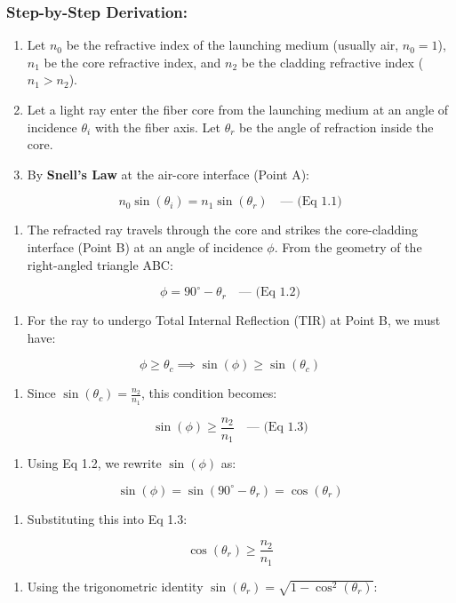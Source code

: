 \subsubsection{Step-by-Step Derivation:}
\begin{enumerate}
  \item Let $n_0$ be the refractive index of the launching medium (usually air, $n_0 = 1$), $n_1$ be the core refractive index, and $n_2$ be the cladding refractive index ($n_1 > n_2$).
  \item Let a light ray enter the fiber core from the launching medium at an angle of incidence $\theta_i$ with the fiber axis. Let $\theta_r$ be the angle of refraction inside the core.
  \item By \textbf{Snell's Law} at the air-core interface (Point A):
\end{enumerate}
    \[ n_0 \sin(\theta_i) = n_1 \sin(\theta_r) \quad \text{--- (Eq 1.1)} \]
\begin{enumerate}
  \item The refracted ray travels through the core and strikes the core-cladding interface (Point B) at an angle of incidence $\phi$. From the geometry of the right-angled triangle ABC:
\end{enumerate}
    \[ \phi = 90^\circ - \theta_r \quad \text{--- (Eq 1.2)} \]
\begin{enumerate}
  \item For the ray to undergo Total Internal Reflection (TIR) at Point B, we must have:
\end{enumerate}
    \[ \phi \ge \theta_c \implies \sin(\phi) \ge \sin(\theta_c) \]
\begin{enumerate}
  \item Since $\sin(\theta_c) = \frac{n_2}{n_1}$, this condition becomes:
\end{enumerate}
    \[ \sin(\phi) \ge \frac{n_2}{n_1} \quad \text{--- (Eq 1.3)} \]
\begin{enumerate}
  \item Using Eq 1.2, we rewrite $\sin(\phi)$ as:
\end{enumerate}
    \[ \sin(\phi) = \sin(90^\circ - \theta_r) = \cos(\theta_r) \]
\begin{enumerate}
  \item Substituting this into Eq 1.3:
\end{enumerate}
    \[ \cos(\theta_r) \ge \frac{n_2}{n_1} \]
\begin{enumerate}
  \item Using the trigonometric identity $\sin(\theta_r) = \sqrt{1 - \cos^2(\theta_r)}$:
\end{enumerate}
